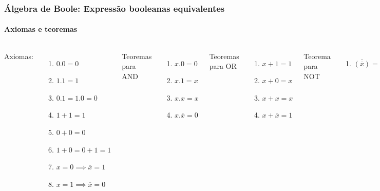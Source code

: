 \begin{frame}
	\label{frm:axiomasETeoremas}
	\frametitle{Álgebra de Boole: Expressão booleanas equivalentes}
	\framesubtitle{Axiomas e teoremas}
	\begin{columns}
			\par Axiomas:
			\begin{enumerate}
				\item $0.0=0$
				\item $1.1=1$
				\item $0.1=1.0=0$
				\item $1+1=1$
				\item $0+0=0$
				\item $1+0=0+1=1$
				\item $x=0 \implies \overline{x}=1$
				\item $x=1 \implies \overline{x}=0$
		\end{enumerate}
			\par Teoremas para AND
			\begin{enumerate}
				\item $x.0=0$
				\item $x.1=x$
				\item $x.x=x$
				\item $x.\overline{x}=0$
			\end{enumerate}
			
			\par Teoremas para OR
			\begin{enumerate}
				\item $x+1=1$
				\item $x+0=x$
				\item $x+x=x$
				\item $x+\overline{x}=1$
			\end{enumerate}
			
			\par Teorema para NOT
			\begin{enumerate}
				\item $\overline{(\overline{x})}=x$
			\end{enumerate}
	\end{columns}
\end{frame}


